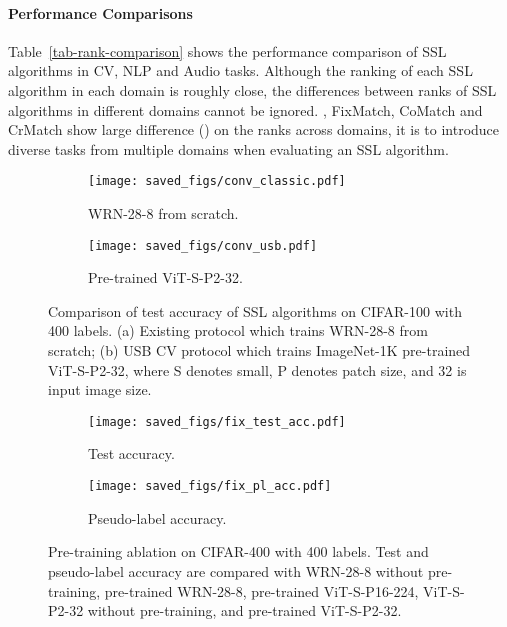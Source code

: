 \documentclass{article}
\newcommand{\revision}[1]{{\color{black}{#1}}}
\begin{document}
\paragraph{Performance Comparisons}
Table~\ref{tab-rank-comparison} shows the performance comparison of SSL algorithms in CV, NLP and Audio tasks. Although the ranking of each SSL algorithm in each domain is roughly close, the differences between ranks of SSL algorithms in different domains cannot be ignored. 
\revision{For example}, FixMatch, CoMatch and CrMatch show large difference () on the ranks across domains, \revision{which indicates that NLP and Audio tasks may have different characteristics compared with CV tasks that are more amenable to certain types of SSL algorithms compared with others. From the task perspective, it is important to consider such characteristics for guiding the choice of SSL methods.}
\revision{From the benchmarking perspective,} it is \revision{useful} to introduce diverse tasks from multiple domains when evaluating an SSL algorithm. 



\begin{figure}[t!]
\centering
\hfill
\begin{subfigure}{0.48\textwidth}
\centering
    \texttt{[image: saved\_figs/conv\_classic.pdf]}
    \caption{WRN-28-8 from scratch.}
    \label{fig-conv-speed-wrn}
\end{subfigure}\begin{subfigure}{0.48\textwidth}
\centering
    \texttt{[image: saved\_figs/conv\_usb.pdf]}
    \caption{Pre-trained ViT-S-P2-32.}
    \label{fig-conv-speed-pretrained-vit}
\end{subfigure}
\hfill
\caption{Comparison of test accuracy of SSL algorithms on CIFAR-100 with 400 labels. (a) Existing protocol which trains WRN-28-8 from scratch; (b) USB CV protocol which trains ImageNet-1K pre-trained ViT-S-P2-32, where S denotes small, P denotes patch size, and 32 is input image size.}
\label{fig-conv-all}
\end{figure}

\begin{figure}[t!]
\hfill
\begin{subfigure}{0.48\textwidth}
\centering
    \texttt{[image: saved\_figs/fix\_test\_acc.pdf]}
    \caption{Test accuracy.}
    \label{fig-test-fix}
\end{subfigure}\begin{subfigure}{0.48\textwidth}
\centering
    \texttt{[image: saved\_figs/fix\_pl\_acc.pdf]}
    \caption{Pseudo-label accuracy.}
    \label{fig-pl-fix}
\end{subfigure}
\hfill
\caption{Pre-training ablation on CIFAR-400 with 400 labels. Test and pseudo-label accuracy are compared with WRN-28-8 without pre-training, pre-trained WRN-28-8, pre-trained ViT-S-P16-224, ViT-S-P2-32 without pre-training, and pre-trained ViT-S-P2-32.}
\label{fig-pl-test-acc}
\end{figure}
\end{document}
